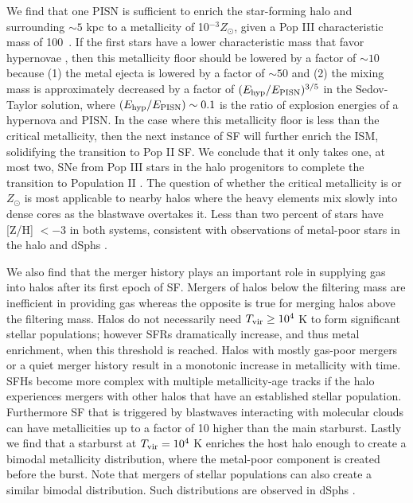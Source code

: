 \documentclass[apjl]{emulateapj}
\begin{document}
We find that one PISN is sufficient to enrich the star-forming halo
and surrounding $\sim 5$ kpc to a metallicity of 10$^{-3} Z_\odot$,
given a Pop III characteristic mass of 100~\Ms.  If the first stars
have a lower characteristic mass that favor hypernovae
\citep{Tumlinson07_IMF}, then this metallicity floor should be lowered
by a factor of $\sim 10$ because (1) the metal ejecta is lowered by a
factor of $\sim 50$ and (2) the mixing mass is approximately decreased
by a factor of $(E_{\rm hyp}/E_{\rm PISN})^{3/5}$ in the Sedov-Taylor
solution, where $(E_{\rm hyp}/E_{\rm PISN}) \sim 0.1$ is the ratio of
explosion energies of a hypernova and PISN.  In the case where this
metallicity floor is less than the critical metallicity, then the next
instance of SF will further enrich the ISM, solidifying the transition
to Pop II SF.  We conclude that it only takes one, at most two, SNe
from Pop III stars in the halo progenitors to complete the transition
to Population II \citep[see also][]{Frebel10}.  The question of
whether the critical metallicity is  or 
$Z_\odot$ is most applicable to nearby halos where the heavy elements
mix slowly into dense cores as the blastwave overtakes it.  Less than
two percent of stars have [Z/H] $< -3$ in both systems, consistent
with observations of metal-poor stars in the halo and dSphs
\citep[e.g.][]{Beers05, Battaglia10}.

We also find that the merger history plays an important role in
supplying gas into halos after its first epoch of SF.  Mergers of
halos below the filtering mass are inefficient in providing gas
whereas the opposite is true for merging halos above the filtering
mass.  Halos do not necessarily need $\tvir \ge 10^4$ K to form
significant stellar populations; however SFRs dramatically increase,
and thus metal enrichment, when this threshold is reached.  Halos with
mostly gas-poor mergers or a quiet merger history result in a
monotonic increase in metallicity with time.  SFHs become more complex
with multiple metallicity-age tracks if the halo experiences mergers
with other halos that have an established stellar population.
Furthermore SF that is triggered by blastwaves interacting with
molecular clouds can have metallicities up to a factor of 10 higher
than the main starburst.  Lastly we find that a starburst at $\tvir =
10^4$ K enriches the host halo enough to create a bimodal metallicity
distribution, where the metal-poor component is created before the
burst.  Note that mergers of stellar populations can also create a
similar bimodal distribution.  Such distributions are observed in
dSphs \citep[e.g.][]{Battaglia10}.
\end{document}
